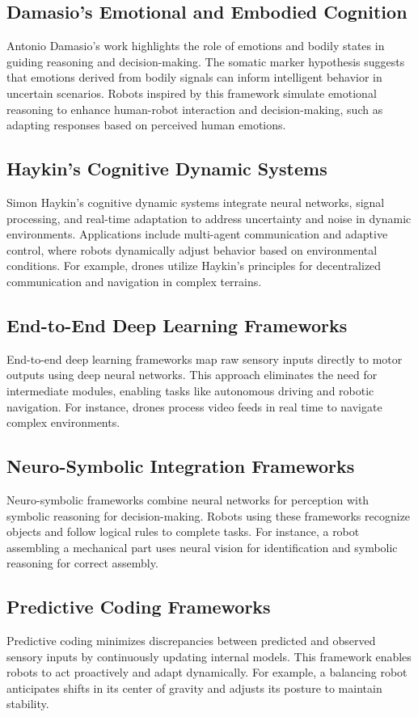     \subsection{Damasio’s Emotional and Embodied Cognition}
    Antonio Damasio's work highlights the role of emotions and bodily states in guiding reasoning and decision-making. The somatic marker hypothesis suggests that emotions derived from bodily signals can inform intelligent behavior in uncertain scenarios. Robots inspired by this framework simulate emotional reasoning to enhance human-robot interaction and decision-making, such as adapting responses based on perceived human emotions. 

    \subsection{Haykin’s Cognitive Dynamic Systems}
    Simon Haykin’s cognitive dynamic systems integrate neural networks, signal processing, and real-time adaptation to address uncertainty and noise in dynamic environments. Applications include multi-agent communication and adaptive control, where robots dynamically adjust behavior based on environmental conditions. For example, drones utilize Haykin’s principles for decentralized communication and navigation in complex terrains. 

    \subsection{End-to-End Deep Learning Frameworks}
    End-to-end deep learning frameworks map raw sensory inputs directly to motor outputs using deep neural networks. This approach eliminates the need for intermediate modules, enabling tasks like autonomous driving and robotic navigation. For instance, drones process video feeds in real time to navigate complex environments. 

    \subsection{Neuro-Symbolic Integration Frameworks}
    Neuro-symbolic frameworks combine neural networks for perception with symbolic reasoning for decision-making. Robots using these frameworks recognize objects and follow logical rules to complete tasks. For instance, a robot assembling a mechanical part uses neural vision for identification and symbolic reasoning for correct assembly. 

    \subsection{Predictive Coding Frameworks}
    Predictive coding minimizes discrepancies between predicted and observed sensory inputs by continuously updating internal models. This framework enables robots to act proactively and adapt dynamically. For example, a balancing robot anticipates shifts in its center of gravity and adjusts its posture to maintain stability. 

